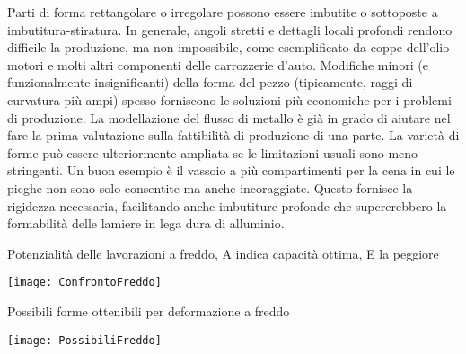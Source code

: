 Parti di forma rettangolare o irregolare possono essere imbutite o sottoposte a imbutitura-stiratura. In generale, angoli stretti e dettagli locali profondi rendono difficile la produzione, ma non impossibile, come esemplificato da coppe dell'olio motori e molti altri componenti delle carrozzerie d'auto. Modifiche minori (e funzionalmente insignificanti) della forma del pezzo (tipicamente, raggi di curvatura più ampi) spesso forniscono le soluzioni più economiche per i problemi di produzione. La modellazione del flusso di metallo è già in grado di aiutare nel fare la prima valutazione sulla fattibilità di produzione di una parte.
La varietà di forme può essere ulteriormente ampliata se le limitazioni usuali sono meno stringenti. Un buon esempio è il vassoio a più compartimenti per la cena in cui le pieghe non sono solo consentite ma anche incoraggiate. Questo fornisce la rigidezza necessaria, facilitando anche imbutiture profonde che supererebbero la formabilità delle lamiere in lega dura di alluminio.

\begin{table}
\centering
\caption{Potenzialità delle lavorazioni a freddo, A indica capacità ottima, E la peggiore}
\label{tab:ConfrontoFreddo}
\texttt{[image: ConfrontoFreddo]}
\end{table}

\begin{table}
\centering
\caption{Possibili forme ottenibili per deformazione a freddo}\label{tab:PossibiliFreddo}
\texttt{[image: PossibiliFreddo]}
\end{table}